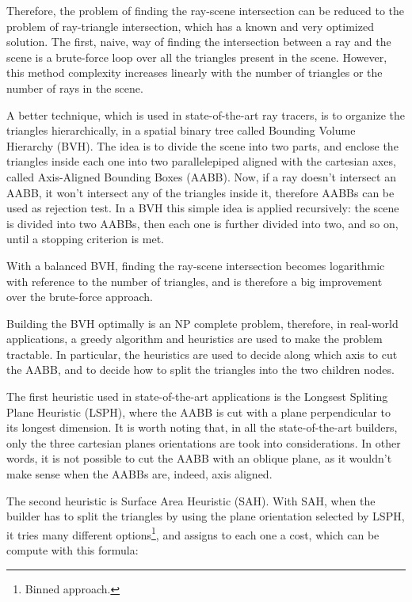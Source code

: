 \documentclass[11pt,a4paper,twocolumn]{article}
\begin{document}
Therefore, the problem of finding the ray-scene intersection can be reduced to the problem of ray-triangle intersection, which has a known and very optimized solution. The first, naive, way of finding the intersection between a ray and the scene is a brute-force loop over all the triangles present in the scene. However, this method complexity increases linearly with the number of triangles or the number of rays in the scene. 

A better technique, which is used in state-of-the-art ray tracers, is to organize the triangles hierarchically, in a spatial binary tree called Bounding Volume Hierarchy (BVH). The idea is to divide the scene into two parts, and enclose the triangles inside each one into two parallelepiped aligned with the cartesian axes, called Axis-Aligned Bounding Boxes (AABB). Now, if a ray doesn't intersect an AABB, it won't intersect any of the triangles inside it, therefore AABBs can be used as rejection test. In a BVH this simple idea is applied recursively: the scene is divided into two AABBs, then each one is further divided into two, and so on, until a stopping criterion is met.

With a balanced BVH, finding the ray-scene intersection becomes logarithmic with reference to the number of triangles, and is therefore a big improvement over the brute-force approach.

Building the BVH optimally is an NP complete problem, therefore, in real-world applications, a greedy algorithm and heuristics are used to make the problem tractable. In particular, the heuristics are used to decide along which axis to cut the AABB, and to decide how to split the triangles into the two children nodes.

The first heuristic used in state-of-the-art applications is the Longsest Spliting Plane Heuristic (LSPH), where the AABB is cut with a plane perpendicular to its longest dimension. It is worth noting that, in all the state-of-the-art builders, only the three cartesian planes orientations are took into considerations. In other words, it is not possible to cut the AABB with an oblique plane, as it wouldn't make sense when the AABBs are, indeed, axis aligned.

The second heuristic is Surface Area Heuristic (SAH). With SAH, when the builder has to split the triangles by using the plane orientation selected by LSPH, it tries many different options\footnote{Binned approach.}, and assigns to each one a cost, which can be compute with this formula:
\end{document}
